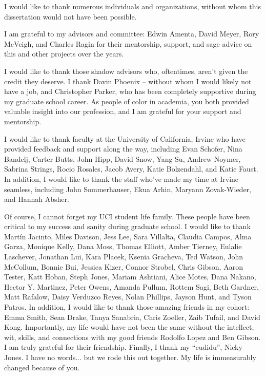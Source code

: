 \acknowledgments
{
  I would like to thank numerous individuals and organizations, without whom this dissertation would not have been possible. 
  
  I am grateful to my advisors and committee: Edwin Amenta, David Meyer, Rory McVeigh, and Charles Ragin for their mentorship, support, and sage advice on this and other projects over the years. 
  
   I would like to thank those shadow advisors who, oftentimes, aren't given the credit they deserve. I thank Davin Phoenix -- without whom I would likely not have a job, and Christopher Parker, who has been completely supportive during my graduate school career. As people of color in academia, you both provided valuable insight into our profession, and I am grateful for your support and mentorship. 
  
  
  
  I would like to thank faculty at the University of California, Irvine who have provided feedback and support along the way, including Evan Schofer, Nina Bandelj, Carter Butts, John Hipp, David Snow, Yang Su, Andrew Noymer, Sabrina Strings, Rocio Rosales, Jacob Avery, Katie Bolzendahl, and Katie Faust. In addition, I would like to thank the staff who've made my time at Irvine seamless, including John Sommerhauser, Ekua Arhin, Maryann Zovak-Wieder, and Hannah Absher.
  
  Of course, I cannot forget my UCI student life family. These people have been critical to my success and sanity during graduate school. I would like to thank Mart\'{i}n Jacinto, Miles Davison, Jess Lee, Sara Villalta, Claudia Campos, Alma Garza, Monique Kelly, Dana Moss, Thomas Elliott, Amber Tierney, Eulalie Laschever, Jonathan Lui, Kara Placek, Ksenia Gracheva, Ted Watson, John McCollum, Bonnie Bui, Jessica Kizer, Connor Strobel, Chris Gibson, Aaron Tester, Katt Hoban, Steph Jones, Mariam Ashtiani, Alice Motes, Dana Nakano, Hector Y. Martinez, Peter Owens, Amanda Pullum, Rottem Sagi, Beth Gardner, Matt Rafalow, Daisy Verduzco Reyes, Nolan Phillips, Jayson Hunt, and Tyson Patros. In addition, I would like to thank those amazing friends in my cohort: Emma Smith, Sean Drake, Tanya Sanabria, Chris Zoeller, Zaib Tufail, and David Kong. Importantly, my life would have not been the same without the intellect, wit, skills, and connections with my good friends Rodolfo Lopez and Ben Gibson. I am truly grateful for their friendship. Finally, I thank my ``cudidu'', Nicky Jones. I have no words... but we rode this out together. My life is immeasurably changed because of you. 
  
}
